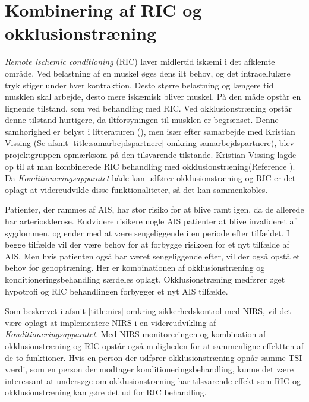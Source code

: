\section{Kombinering af RIC og okklusionstræning}
\textit{Remote ischemic conditioning} (RIC) laver midlertid iskæmi i det afklemte område. Ved belastning af en muskel øges dens ilt behov, og det intracellulære tryk stiger under hver kontraktion. Desto større belastning og længere tid musklen skal arbejde, desto mere iskæmisk bliver muskel. På den måde opstår en lignende tilstand, som ved behandling med RIC. Ved okklusionstræning opstår denne tilstand hurtigere, da iltforsyningen til musklen er begrænset. Denne samhørighed er belyst i litteraturen (\cite{RefWorks:3}), men især efter samarbejde med Kristian Vissing (Se afsnit \ref{title:samarbejdspartnere} omkring samarbejdspartnere), blev projektgruppen opmærksom på den tilsvarende tilstande. Kristian Vissing lagde op til at man kombinerede RIC behandling med okklusionstræning(Reference ). Da \textit{Konditioneringsapparatet} både kan udfører okklusionstræning og RIC er det oplagt at videreudvikle disse funktionaliteter, så det kan sammenkobles. 

Patienter, der rammes af AIS, har stor risiko for at blive ramt igen, da de allerede har arteriosklerose. Endvidere risikere nogle AIS patienter at blive invalideret af sygdommen, og ender med at være sengeliggende i en periode efter tilfældet. I begge tilfælde vil der være behov for at forbygge risikoen for et nyt tilfælde af AIS. Men hvis patienten også har været sengeliggende efter, vil der også opstå et behov for genoptræning. Her er kombinationen af okklusionstræning og konditioneringsbehandling særdeles oplagt. Okklusionstræning medfører øget hypotrofi og RIC behandlingen forbygger et nyt AIS tilfælde.   

Som beskrevet i afsnit \ref{title:nirs} omkring sikkerhedskontrol med NIRS, vil det være oplagt at implementere NIRS i en videreudvikling af \textit{Konditioneringsapparatet}. Med NIRS monitoreringen og kombination af okklusionstræning og RIC opstår også muligheden for at sammenligne effektten af de to funktioner. Hvis en person der udfører okklusionstræning opnår samme TSI værdi, som en person der modtager konditioneringsbehandling, kunne det være interessant at undersøge om okklusionstræning har tilsvarende effekt som RIC og okklusionstræning kan gøre det ud for RIC behandling. 
